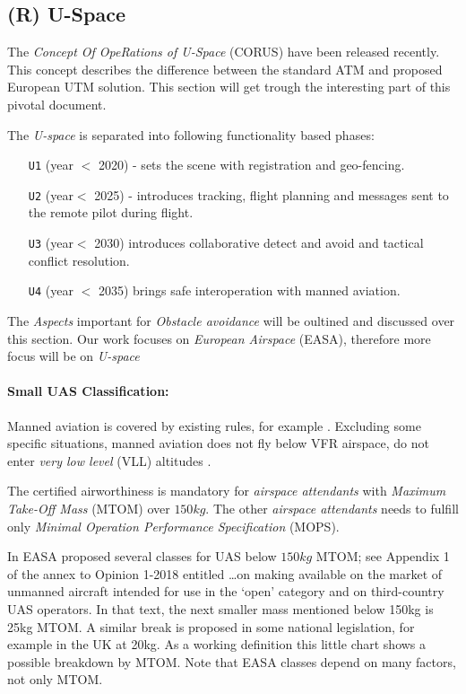 \subsection{(R) U-Space}\label{sec:USpace}

\noindent The \emph{Concept Of OpeRations of U-Space} (CORUS) \cite{corus2018} have been released recently. This concept describes the difference between the standard ATM and proposed European UTM solution. This section will get trough the interesting part of this pivotal document.

\noindent The \emph{U-space} is separated into following functionality based phases:
\begin{itemize}
    \item[\texttt{U1}] (year $<$ 2020) - sets the scene with registration and geo-fencing.
    
    \item[\texttt{U2}] (year$<$ 2025) - introduces tracking, flight planning and messages sent to the remote pilot during flight.
    
    \item[\texttt{U3}] (year$<$ 2030) introduces collaborative detect and avoid and tactical conflict resolution.
    
    \item[\texttt{U4}] (year $<$ 2035) brings safe interoperation with manned aviation.
\end{itemize}

The \emph{Aspects} important for \emph{Obstacle avoidance} will be oultined and discussed over this section. Our work focuses on \emph{European Airspace} (EASA), therefore more focus will be on \emph{U-space}

\paragraph{Small UAS Classification:} Manned aviation is covered by existing rules, for example \cite{icaoAnnex2,ec201208ref5}. Excluding some specific situations, manned aviation does not fly below VFR airspace, do not enter \emph{very low level} (VLL) altitudes \cite{ec200802ref4}. 

The certified airworthiness is mandatory for \emph{airspace attendants} with \emph{Maximum Take-Off Mass} (MTOM) over $150 kg$. The other \emph{airspace attendants} needs to fulfill only \emph{Minimal Operation Performance Specification} (MOPS). 

In \cite{easa201801op} EASA proposed several classes for UAS below $150kg$ MTOM; see Appendix 1 of the annex to
Opinion 1-2018 entitled …on making available on the market of unmanned aircraft intended for use in
the ‘open’ category and on third-country UAS operators. In that text, the next smaller mass mentioned
below 150kg is 25kg MTOM. A similar break is proposed in some national legislation, for example in
the UK at 20kg. As a working definition this little chart shows a possible breakdown by MTOM. Note
that EASA classes depend on many factors, not only MTOM.

